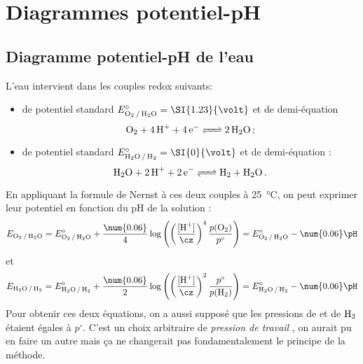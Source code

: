 \documentclass{cours}
\begin{document}
\setcounter{chapter}{19}
\chapter{Diagrammes potentiel-pH}

\section{Diagramme potentiel-pH de l'eau}%
\label{sec:diagramme_potentiel_ph_de_l_eau}

L'eau intervient dans les couples redox suivants:
\begin{itemize}
  \item {} de potentiel standard $E^\circ_{\ce{O2 / H2O}}=\SI{1.23}{\volt}$ et de demi-équation
  \begin{equation}
    \ce{O2 + 4H+ + 4e- <=> 2H2O}\,;
  \end{equation}
  \item {} de potentiel standard $E^\circ_{\ce{H2O / H2}}=\SI{0}{\volt}$ et de demi-équation :
  \begin{equation}
    \ce{H2O + 2H+ + 2e- <=>H2 + H2O}\, .
  \end{equation}
\end{itemize}
En appliquant la formule de Nernst à ces deux couples à \SI{25}{\celsius}, on peut exprimer leur potentiel en fonction du pH de la solution :
  \begin{equation}
  E_{\ce{O2 / H2O}} = E_{\ce{O2 / H2O}}^\circ + \frac{\num{0.06}}{4}\log\left( \left(\frac{[\ce{H+}]}{\cz}\right)^4  \frac{p(\ce{O2})}{p^\circ}\right) = E_{\ce{O2 / H2O}}^\circ - \num{0.06}\pH
  \end{equation}
  et
  \begin{equation}
  E_{\ce{H2O / H2}} = E_{\ce{H2O / H2}}^\circ + \frac{\num{0.06}}{2}\log\left( \left(\frac{[\ce{H+}]}{\cz}\right)^2  \frac{p^\circ}{p(\ce{H2})}\right) = E_{\ce{H2O / H2}}^\circ - \num{0.06}\pH
  \end{equation}
Pour obtenir ces deux équations, on a aussi supposé que les pressions de  et de $\ce{H2}$ étaient égales à $p^\circ$. C'est un choix arbitraire de \emph{pression de travail} , on aurait pu en faire un autre mais ça ne changerait pas fondamentalement le principe de la méthode.
\end{document}
